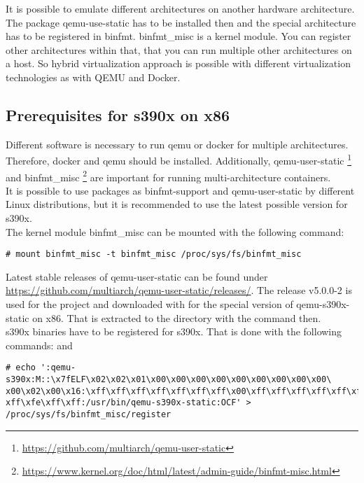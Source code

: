 It is possible to emulate different architectures on another hardware architecture. The package qemu-use-static has to be installed then and the special architecture has to be registered in binfmt. binfmt\_misc is a kernel module. You can register other architectures within that, that you can run multiple other architectures on a host. So hybrid virtualization approach is possible with different virtualization technologies as with QEMU and Docker.

\subsection{Prerequisites for s390x on x86}

Different software is necessary to run qemu or docker for multiple architectures. Therefore, docker and qemu should be installed. Additionally, qemu-user-static \footnote{\url{https://github.com/multiarch/qemu-user-static}} and binfmt\_misc \footnote{\url{https://www.kernel.org/doc/html/latest/admin-guide/binfmt-misc.html}} are important for running multi-architecture containers. \\

It is possible to use packages as binfmt-support and qemu-user-static by different Linux distributions, but it is recommended to use the latest possible version for s390x. \\

The kernel module binfmt\_misc can be mounted with the following command: 
\begin{lstlisting}[style=BashInputStyle]
  # mount binfmt_misc -t binfmt_misc /proc/sys/fs/binfmt_misc
\end{lstlisting}
Latest stable releases of qemu-user-static can be found under \url{https://github.com/multiarch/qemu-user-static/releases/}. The release v5.0.0-2 is used for the project and downloaded with  for the special version of qemu-s390x-static on x86. That is extracted to the directory  with the command  then. \\

s390x binaries have to be registered for s390x. That is done with the following commands:  and \begin{verbatim}
# echo ':qemu-s390x:M::\x7fELF\x02\x02\x01\x00\x00\x00\x00\x00\x00\x00\x00\x00\ 
x00\x02\x00\x16:\xff\xff\xff\xff\xff\xff\xff\x00\xff\xff\xff\xff\xff\xff\xff\xff\
xff\xfe\xff\xff:/usr/bin/qemu-s390x-static:OCF' > /proc/sys/fs/binfmt_misc/register
\end{verbatim}

